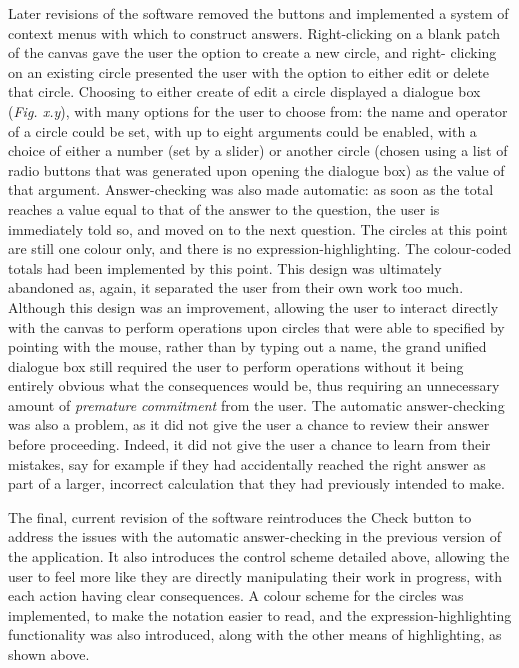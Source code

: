 \documentclass[12pt,twoside,notitlepage,xetex]{report}
\begin{document}
Later revisions of the software removed the buttons and implemented a system of
context menus with which to construct answers. Right-clicking on a blank patch
of the canvas gave the user the option to create a new circle, and right-
clicking on an existing circle presented the user with the option to either
edit or delete that circle.  Choosing to either create of edit a circle
displayed a dialogue box (\emph{Fig. x.y}), with many options for the user to
choose from: the name and operator of a circle could be set, with up to eight
arguments could be enabled, with a choice of either a number (set by a slider)
or another circle (chosen using a list of radio buttons that was generated upon
opening the dialogue box) as the value of that argument.  Answer-checking was
also made automatic: as soon as the total reaches a value equal to that of the
answer to the question, the user is immediately told so, and moved on to the
next question.  The circles at this point are still one colour only, and there
is no expression-highlighting.  The colour-coded totals had been implemented by
this point.  This design was ultimately abandoned  as, again, it separated the
user from their own work too much.  Although this design was an improvement,
allowing the user to interact directly with the canvas to perform operations
upon circles that were able to specified by pointing with the mouse, rather
than by typing out a name, the grand unified dialogue box still required the
user to perform operations without it being entirely obvious what the
consequences would be, thus requiring an unnecessary amount of
\emph{premature commitment} from the user.  The automatic answer-checking was
also a problem, as it did not give the user a chance to review their answer
before proceeding.  Indeed, it did not give the user a chance to learn from
their mistakes, say for example if they had accidentally reached the right
answer as part of a larger, incorrect calculation that they had previously
intended to make.

The final, current revision of the software reintroduces the {\sfapp Check}
button to address the issues with the automatic answer-checking in the
previous version of the application.  It also introduces the control scheme
detailed above, allowing the user to feel more like they are directly
manipulating their work in progress, with each action having clear
consequences.  A colour scheme for the circles was implemented, to make the
notation easier to read, and the expression-highlighting functionality was also
introduced, along with the other means of highlighting, as shown above.
\end{document}
